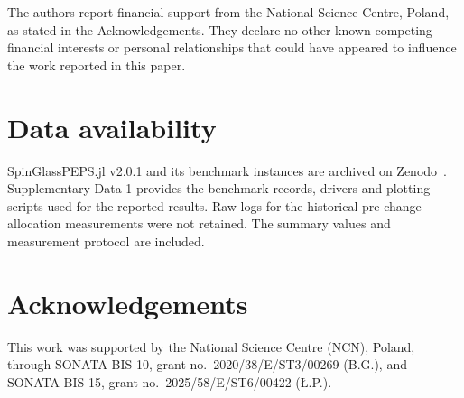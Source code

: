 \documentclass[preprint,12pt,a4paper]{elsarticle}
\begin{document}
The authors report financial support from the National Science Centre, Poland,
as stated in the Acknowledgements. They declare no other known competing
financial interests or personal relationships that could have appeared to
influence the work reported in this paper.

\section*{Data availability}

SpinGlassPEPS.jl v2.0.1 and its benchmark instances are archived on
Zenodo~\cite{spinglasspeps_zenodo}. Supplementary Data 1 provides the benchmark
records, drivers and plotting scripts used for the reported results. Raw logs
for the historical pre-change allocation measurements were not retained. The
summary values and measurement protocol are included.

\section*{Acknowledgements}
\label{acknowledgements}

This work was supported by the National Science Centre (NCN), Poland, through
SONATA BIS 10, grant no.~2020/38/E/ST3/00269 (B.G.), and SONATA BIS 15, grant
no.~2025/58/E/ST6/00422 ({\L}.P.).



\end{document}
